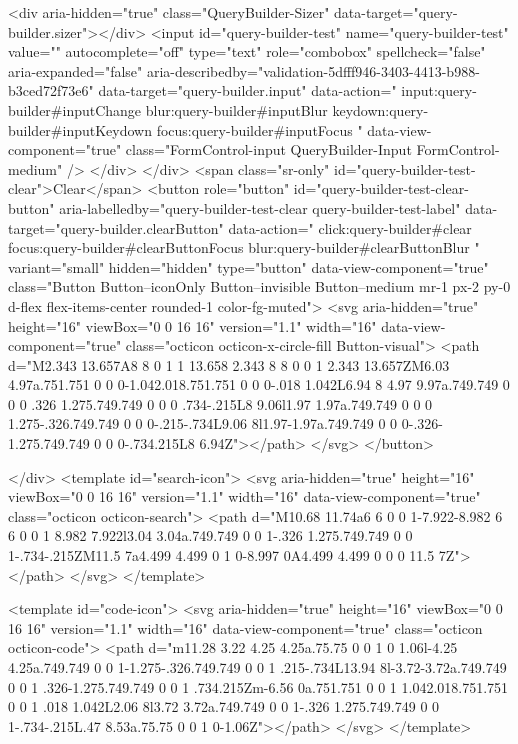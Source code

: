             <div aria-hidden="true" class="QueryBuilder-Sizer" data-target="query-builder.sizer"></div>
            <input id="query-builder-test" name="query-builder-test" value="" autocomplete="off" type="text" role="combobox" spellcheck="false" aria-expanded="false" aria-describedby="validation-5dfff946-3403-4413-b988-b3ced72f73e6" data-target="query-builder.input" data-action="
          input:query-builder#inputChange
          blur:query-builder#inputBlur
          keydown:query-builder#inputKeydown
          focus:query-builder#inputFocus
        " data-view-component="true" class="FormControl-input QueryBuilder-Input FormControl-medium" />
          </div>
        </div>
          <span class="sr-only" id="query-builder-test-clear">Clear</span>
          <button role="button" id="query-builder-test-clear-button" aria-labelledby="query-builder-test-clear query-builder-test-label" data-target="query-builder.clearButton" data-action="
                click:query-builder#clear
                focus:query-builder#clearButtonFocus
                blur:query-builder#clearButtonBlur
              " variant="small" hidden="hidden" type="button" data-view-component="true" class="Button Button--iconOnly Button--invisible Button--medium mr-1 px-2 py-0 d-flex flex-items-center rounded-1 color-fg-muted">  <svg aria-hidden="true" height="16" viewBox="0 0 16 16" version="1.1" width="16" data-view-component="true" class="octicon octicon-x-circle-fill Button-visual">
    <path d="M2.343 13.657A8 8 0 1 1 13.658 2.343 8 8 0 0 1 2.343 13.657ZM6.03 4.97a.751.751 0 0 0-1.042.018.751.751 0 0 0-.018 1.042L6.94 8 4.97 9.97a.749.749 0 0 0 .326 1.275.749.749 0 0 0 .734-.215L8 9.06l1.97 1.97a.749.749 0 0 0 1.275-.326.749.749 0 0 0-.215-.734L9.06 8l1.97-1.97a.749.749 0 0 0-.326-1.275.749.749 0 0 0-.734.215L8 6.94Z"></path>
</svg>
</button>

      </div>
      <template id="search-icon">
  <svg aria-hidden="true" height="16" viewBox="0 0 16 16" version="1.1" width="16" data-view-component="true" class="octicon octicon-search">
    <path d="M10.68 11.74a6 6 0 0 1-7.922-8.982 6 6 0 0 1 8.982 7.922l3.04 3.04a.749.749 0 0 1-.326 1.275.749.749 0 0 1-.734-.215ZM11.5 7a4.499 4.499 0 1 0-8.997 0A4.499 4.499 0 0 0 11.5 7Z"></path>
</svg>
</template>

<template id="code-icon">
  <svg aria-hidden="true" height="16" viewBox="0 0 16 16" version="1.1" width="16" data-view-component="true" class="octicon octicon-code">
    <path d="m11.28 3.22 4.25 4.25a.75.75 0 0 1 0 1.06l-4.25 4.25a.749.749 0 0 1-1.275-.326.749.749 0 0 1 .215-.734L13.94 8l-3.72-3.72a.749.749 0 0 1 .326-1.275.749.749 0 0 1 .734.215Zm-6.56 0a.751.751 0 0 1 1.042.018.751.751 0 0 1 .018 1.042L2.06 8l3.72 3.72a.749.749 0 0 1-.326 1.275.749.749 0 0 1-.734-.215L.47 8.53a.75.75 0 0 1 0-1.06Z"></path>
</svg>
</template>

